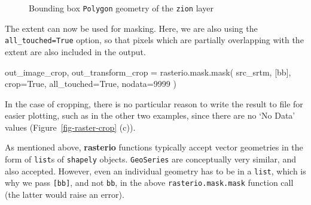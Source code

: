 \documentclass[
  letterpaper,
]{krantz}
\newenvironment{Shaded}{\begin{snugshade}}{\end{snugshade}}
\newcommand{\DecValTok}[1]{\textcolor[rgb]{0.68,0.00,0.00}{#1}}
\newcommand{\NormalTok}[1]{\textcolor[rgb]{0.00,0.23,0.31}{#1}}
\newcommand{\OperatorTok}[1]{\textcolor[rgb]{0.37,0.37,0.37}{#1}}
\newcommand{\VariableTok}[1]{\textcolor[rgb]{0.07,0.07,0.07}{#1}}
\begin{document}
\begin{figure}[H]


\caption{\label{fig-zion-bbox}Bounding box
\texttt{\textquotesingle{}Polygon\textquotesingle{}} geometry of the
\texttt{zion} layer}

\end{figure}%

The extent can now be used for masking. Here, we are also using the
\texttt{all\_touched=True} option, so that pixels which are partially
overlapping with the extent are also included in the output.

\begin{Shaded}
\begin{Highlighting}[]
\NormalTok{out\_image\_crop, out\_transform\_crop }\OperatorTok{=}\NormalTok{ rasterio.mask.mask(}
\NormalTok{    src\_srtm, }
\NormalTok{    [bb], }
\NormalTok{    crop}\OperatorTok{=}\VariableTok{True}\NormalTok{, }
\NormalTok{    all\_touched}\OperatorTok{=}\VariableTok{True}\NormalTok{, }
\NormalTok{    nodata}\OperatorTok{=}\DecValTok{9999}
\NormalTok{)}
\end{Highlighting}
\end{Shaded}

In the case of cropping, there is no particular reason to write the
result to file for easier plotting, such as in the other two examples,
since there are no `No Data' values (Figure~\ref{fig-raster-crop} (c)).

\begin{tcolorbox}[enhanced jigsaw, breakable, title=\textcolor{quarto-callout-note-color}{\faInfo}\hspace{0.5em}{Note}, arc=.35mm, opacitybacktitle=0.6, left=2mm, colback=white, bottomrule=.15mm, bottomtitle=1mm, toptitle=1mm, colframe=quarto-callout-note-color-frame, leftrule=.75mm, rightrule=.15mm, toprule=.15mm, titlerule=0mm, opacityback=0, colbacktitle=quarto-callout-note-color!10!white, coltitle=black]

As mentioned above, \textbf{rasterio} functions typically accept vector
geometries in the form of \texttt{list}s of \texttt{shapely} objects.
\texttt{GeoSeries} are conceptually very similar, and also accepted.
However, even an individual geometry has to be in a \texttt{list}, which
is why we pass \texttt{{[}bb{]}}, and not \texttt{bb}, in the above
\texttt{rasterio.mask.mask} function call (the latter would raise an
error).

\end{tcolorbox}
\end{document}
